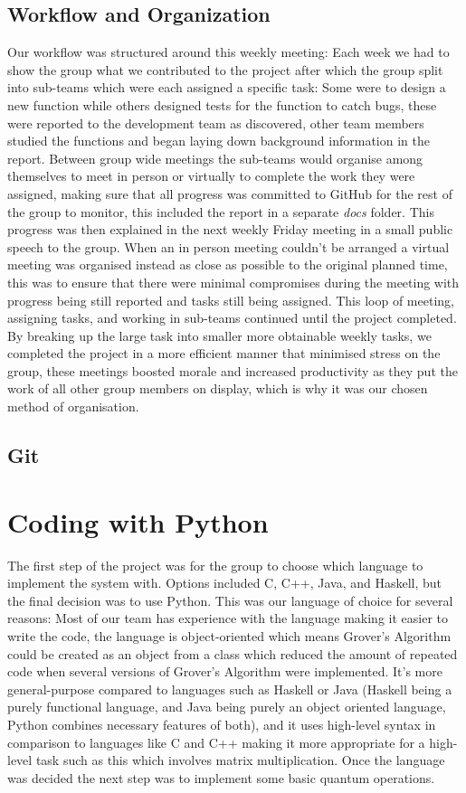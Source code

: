 \documentclass{article}
\begin{document}
\subsection{Workflow and Organization}
Our workflow was structured around this weekly meeting: Each week we had to show the group what we contributed to the project after which the group split into sub-teams which were each assigned a specific task: Some were to design a new function while others designed tests for the function to catch bugs, these were reported to the development team as discovered, other team members studied the functions and began laying down background information in the report. Between group wide meetings the sub-teams would organise among themselves to meet in person or virtually to complete the work they were assigned, making sure that all progress was committed to GitHub for the rest of the group to monitor, this included the report in a separate \textit{docs} folder. This progress was then explained in the next weekly Friday meeting in a small public speech to the group. When an in person meeting couldn't be arranged a virtual meeting was organised instead as close as possible to the original planned time, this was to ensure that there were minimal compromises during the meeting with progress being still reported and tasks still being assigned. This loop of meeting, assigning tasks, and working in sub-teams continued until the project completed. By breaking up the large task into smaller more obtainable weekly tasks, we completed the project in a more efficient manner that minimised stress on the group, these meetings boosted morale and increased productivity as they put the work of all other group members on display, which is why it was our chosen method of organisation.

\subsection{Git}

\pagebreak

\section{Coding with Python}
The first step of the project was for the group to choose which language to implement the system with. Options included C, C++, Java, and Haskell, but the final decision was to use Python. This was our language of choice for several reasons: Most of our team has experience with the language making it easier to write the code, the language is object-oriented which means Grover’s Algorithm could be created as an object from a class which reduced the amount of repeated code when several versions of Grover's Algorithm were  implemented. It’s more general-purpose compared to languages such as Haskell or Java (Haskell being a purely functional language, and Java being purely an object oriented language, Python combines necessary features of both), and it uses high-level syntax in comparison to languages like C and C++ making it more appropriate for a high-level task such as this which involves matrix multiplication. Once the language was decided the next step was to implement some basic quantum operations.
\end{document}
